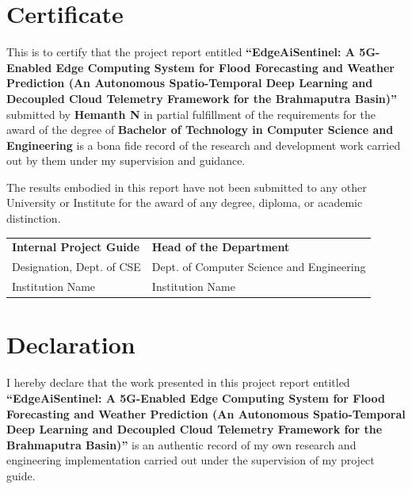 \documentclass[12pt,a4paper,oneside]{report}
\begin{document}
\newpage
{}
\setcounter{page}{2}

\chapter*{Certificate}
\thispagestyle{plain}

This is to certify that the project report entitled \textbf{``EdgeAiSentinel: A 5G-Enabled Edge Computing System for Flood Forecasting and Weather Prediction (An Autonomous Spatio-Temporal Deep Learning and Decoupled Cloud Telemetry Framework for the Brahmaputra Basin)''} submitted by \textbf{Hemanth N} in partial fulfillment of the requirements for the award of the degree of \textbf{Bachelor of Technology in Computer Science and Engineering} is a bona fide record of the research and development work carried out by them under my supervision and guidance.

The results embodied in this report have not been submitted to any other University or Institute for the award of any degree, diploma, or academic distinction.

\vspace{3.0cm}

\noindent
\begin{tabular}{p{7.5cm}p{7.5cm}}
\textbf{Internal Project Guide} & \textbf{Head of the Department} \\
Designation, Dept. of CSE & Dept. of Computer Science and Engineering \\
Institution Name & Institution Name \\
\end{tabular}

\newpage
\chapter*{Declaration}
\thispagestyle{plain}

I hereby declare that the work presented in this project report entitled \textbf{``EdgeAiSentinel: A 5G-Enabled Edge Computing System for Flood Forecasting and Weather Prediction (An Autonomous Spatio-Temporal Deep Learning and Decoupled Cloud Telemetry Framework for the Brahmaputra Basin)''} is an authentic record of my own research and engineering implementation carried out under the supervision of my project guide.
\end{document}
